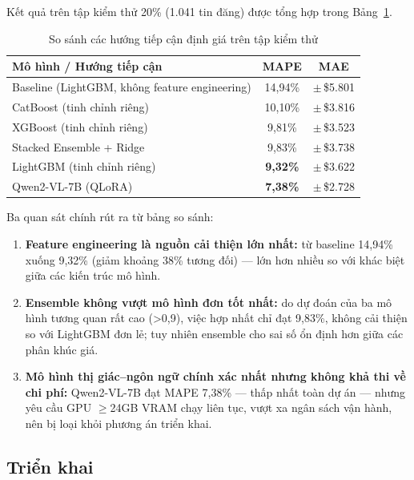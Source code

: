 Kết quả trên tập kiểm thử 20\% (1.041 tin đăng) được tổng hợp trong Bảng~\ref{tab:price-results}.

\begin{table}[H]
\centering
\small
\caption{So sánh các hướng tiếp cận định giá trên tập kiểm thử}
\label{tab:price-results}
\begin{tabular}{|l|c|c|}
\hline
\textbf{Mô hình / Hướng tiếp cận} & \textbf{MAPE} & \textbf{MAE} \\
\hline
Baseline (LightGBM, không feature engineering) & 14{,}94\% & $\pm$\,\$5.801 \\
\hline
CatBoost (tinh chỉnh riêng) & 10{,}10\% & $\pm$\,\$3.816 \\
\hline
XGBoost (tinh chỉnh riêng) & 9{,}81\% & $\pm$\,\$3.523 \\
\hline
Stacked Ensemble + Ridge & 9{,}83\% & $\pm$\,\$3.738 \\
\hline
LightGBM (tinh chỉnh riêng) & \textbf{9{,}32\%} & $\pm$\,\$3.622 \\
\hline
Qwen2-VL-7B (QLoRA) & \textbf{7{,}38\%} & $\pm$\,\$2.728 \\
\hline
\end{tabular}
\end{table}

Ba quan sát chính rút ra từ bảng so sánh:

\begin{enumerate}
    \item \textbf{Feature engineering là nguồn cải thiện lớn nhất:} từ baseline 14{,}94\% xuống 9{,}32\% (giảm khoảng 38\% tương đối) --- lớn hơn nhiều so với khác biệt giữa các kiến trúc mô hình.
    \item \textbf{Ensemble không vượt mô hình đơn tốt nhất:} do dự đoán của ba mô hình tương quan rất cao (>0{,}9), việc hợp nhất chỉ đạt 9{,}83\%, không cải thiện so với LightGBM đơn lẻ; tuy nhiên ensemble cho sai số ổn định hơn giữa các phân khúc giá.
    \item \textbf{Mô hình thị giác--ngôn ngữ chính xác nhất nhưng không khả thi về chi phí:} Qwen2-VL-7B đạt MAPE 7{,}38\% --- thấp nhất toàn dự án --- nhưng yêu cầu GPU $\geq$24GB VRAM chạy liên tục, vượt xa ngân sách vận hành, nên bị loại khỏi phương án triển khai.
\end{enumerate}

\subsection{Triển khai}

